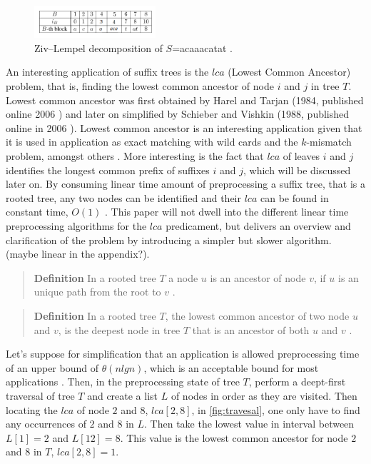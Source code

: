 \documentclass[12pt]{article} %
\begin{document}
\begin{figure}[H]
    \centering
    \includegraphics[width=0.4\textwidth]{Lempeltrue}
    \captionsetup{width=0.8
    \textwidth}
    \caption{Ziv–Lempel decomposition of $S$=acaaacatat \cite{enchancedsuffix}.}
    \label{fig:Lempeltrue}
\end{figure}

An interesting application of suffix trees is the $lca$ (Lowest Common Ancestor) problem, that is, finding the lowest common ancestor of node $i$ and $j$ in tree $T$. 
Lowest common ancestor was first obtained by Harel and Tarjan (1984, published online 2006 \cite{lcaWeb}) and later on simplified by Schieber and Vishkin (1988, published online in 2006 \cite{lcaWebSch})\cite{gusfield}.
\newline
Lowest common ancestor is an interesting application given that it is used in application as exact matching with wild cards and the $k$-mismatch problem, amongst others \cite{gusfield}. More interesting is the fact that $lca$ of leaves $i$ and $j$ identifies the longest common prefix of suffixes $i$ and $j$, which will be discussed later on.
\newline
By consuming linear time amount of preprocessing a suffix tree, that is a rooted tree, any two nodes can be identified and their $lca$ can be found in constant time, $O(1)$ \cite{gusfield, lca}. This paper will not dwell into the different linear time preprocessing algorithms for the $lca$ predicament, but delivers an overview and clarification of the problem by introducing a simpler but slower algorithm. (maybe linear in the appendix?).
\begin{quote}
\textbf{Definition}   In a rooted tree $T$ a node $u$ is an ancestor of node $v$, if $u$ is an unique path from the root to $v$ \cite{gusfield}.
\end{quote}
\begin{quote}
\textbf{Definition}   In a rooted tree $T$, the lowest common ancestor of two node $u$ and $v$, is the deepest node in tree $T$ that is an ancestor of both $u$ and $v$ \cite{gusfield}.
\end{quote}
Let’s suppose for simplification that an application is allowed preprocessing time of an upper bound of $\theta (n lg n)$, which is an acceptable bound for most applications \cite{gusfield}. Then, in the preprocessing state of tree $T$, perform a deept-first traversal of tree $T$ and create a list $L$ of nodes in order as they are visited. Then locating the $lca$ of node $2$ and $8$, $lca[2,8]$, in \cref{fig:travesal}, one only have to find any occurrences of $2$ and $8$ in $L$. Then take the lowest value in interval between $L[1] = 2$ and $L[12]=8$. This value is the lowest common ancestor for node $2$ and $8$ in $T$, $lca[2,8]=1$.
\end{document}
